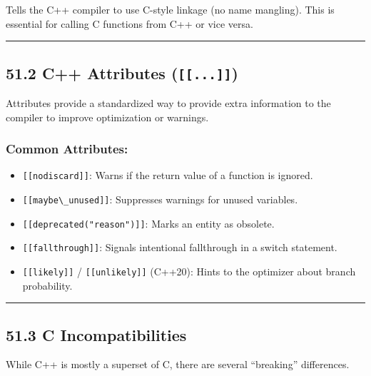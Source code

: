 Tells the C++ compiler to use C-style linkage (no name mangling). This
is essential for calling C functions from C++ or vice versa.

\begin{center}\rule{0.5\linewidth}{0.5pt}\end{center}

\hypertarget{c-attributes-...}{%
\subsection{\texorpdfstring{51.2 C++ Attributes
(\texttt{{[}{[}...{]}{]}})}{51.2 C++ Attributes ({[}{[}...{]}{]})}}\label{c-attributes-...}}

Attributes provide a standardized way to provide extra information to
the compiler to improve optimization or warnings.

\hypertarget{common-attributes}{%
\subsubsection{Common Attributes:}\label{common-attributes}}

\begin{itemize}
\tightlist
\item
  \passthrough{\lstinline![[nodiscard]]!}: Warns if the return value of
  a function is ignored.
\item
  \passthrough{\lstinline![[maybe\_unused]]!}: Suppresses warnings for
  unused variables.
\item
  \passthrough{\lstinline![[deprecated("reason")]]!}: Marks an entity as
  obsolete.
\item
  \passthrough{\lstinline![[fallthrough]]!}: Signals intentional
  fallthrough in a switch statement.
\item
  \passthrough{\lstinline![[likely]]!} /
  \passthrough{\lstinline![[unlikely]]!} (C++20): Hints to the optimizer
  about branch probability.
\end{itemize}

\begin{center}\rule{0.5\linewidth}{0.5pt}\end{center}

\hypertarget{c-incompatibilities}{%
\subsection{51.3 C Incompatibilities}\label{c-incompatibilities}}

While C++ is mostly a superset of C, there are several ``breaking''
differences.

